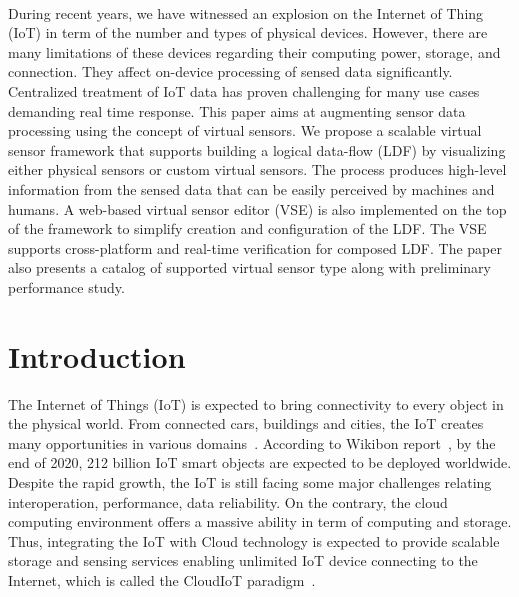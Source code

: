 \paragraph{}During recent years, we have witnessed an explosion on the Internet of Thing (IoT) in term of the number and types of physical devices. However, there are many limitations of these devices regarding their computing power, storage, and connection. They affect on-device processing of sensed data significantly. Centralized treatment of IoT data has proven challenging for many use cases demanding real time response. This paper aims at augmenting sensor data processing using the concept of virtual sensors. We propose a scalable virtual sensor framework that supports building a logical data-flow (LDF) by visualizing either physical sensors or custom virtual sensors. The process produces high-level information from the sensed data that can be easily perceived by machines and humans. A web-based virtual sensor editor (VSE) is also implemented on the top of the framework to simplify creation and configuration of the LDF. The VSE supports cross-platform and real-time verification for composed LDF. The paper also presents a catalog of supported virtual sensor type along with preliminary performance study.

\section{Introduction}
The Internet of Things (IoT) is expected to bring connectivity to every object in the physical world. From connected cars, buildings and cities, the IoT creates many opportunities in various domains~\cite{AlFuqahaGuizaniMohammadiAledhariAyyash2015}. According to Wikibon report~\cite{Floyer2013}, by the end of 2020, 212 billion IoT smart objects are expected to be deployed worldwide. Despite the rapid growth, the IoT is still facing some major challenges relating interoperation, performance, data reliability. On the contrary, the cloud computing environment offers a massive ability in term of computing and storage. Thus, integrating the IoT with Cloud technology is expected to provide scalable storage and sensing services enabling unlimited IoT device connecting to the Internet, which is called the CloudIoT paradigm~\cite{BottaDonatoPersicoPescape2014}.\\

